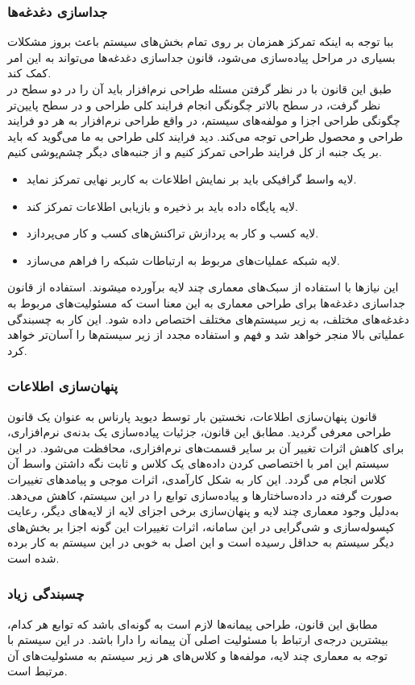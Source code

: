 \documentclass[12pt]{article}
\begin{document}
	\subsubsection{جداسازی دغدغه‌ها}
	ببا توجه به اینکه تمرکز همزمان بر روی تمام بخش‌های سیستم باعث بروز مشکلات بسیاری در مراحل پیاده‌سازی می‌شود، قانون جداسازی ‌دغدغه‌ها می‌تواند به این امر کمک کند.\\
	طبق این قانون با در نظر گرفتن مسئله طراحی نرم‌افزار باید آن را در دو سطح در نظر گرفت، در سطح بالاتر چگونگی انجام فرایند کلی طراحی و در سطح پایین‌تر چگونگی طراحی اجزا و مولفه‌های سیستم، در واقع طراحی نرم‌افزار به هر دو فرایند طراحی و محصول طراحی توجه می‌کند. دید فرایند کلی طراحی به ما می‌گوید که باید بر یک جنبه از کل فرایند طراحی تمرکز کنیم و از جنبه‌های دیگر چشم‌پوشی کنیم.

	\begin{itemize}
		\item
		لایه واسط گرافیکی باید بر نمایش اطلاعات به کاربر نهایی تمرکز نماید.
		\item
		لایه پایگاه داده باید بر ذخیره و بازیابی اطلاعات تمرکز کند.
		\item
		لایه کسب و کار به پردازش تراکنش‌های کسب و کار می‌پردازد.
		\item
		لایه شبکه عملیات‌های مربوط به ارتباطات شبکه را فراهم می‌سازد.
	\end{itemize}
این نیازها با استفاده از سبک‌های معماری چند لایه برآورده میشوند. استفاده از قانون جداسازی دغدغه‌ها برای طراحی معماری به این معنا است که مسئولیت‌های مربوط به دغدغه‌های مختلف، به زیر سیستم‌های مختلف اختصاص داده شود. این کار به چسبندگی عملیاتی بالا منجر خواهد شد و فهم و استفاده مجدد از زیر سیستم‌ها را آسان‌تر خواهد کرد.
	\subsubsection{پنهان‌سازی اطلاعات}
	قانون پنهان‌سازی اطلاعات، نخستین بار توسط دیوید پارناس به عنوان یک قانون طراحی معرفی گردید. مطابق این قانون، جزئیات پیاده‌سازی یک بدنه‌ی نرم‌افزاری، برای کاهش اثرات تغییر آن بر سایر قسمت‌های نرم‌افزاری، محافظت می‌شود. در این سیستم این امر با اختصاصی کردن داده‌های یک کلاس و ثابت نگه داشتن واسط آن کلاس انجام می‌ گردد. این کار به شکل کارآمدی، اثرات موجی و پیامدهای تغییرات صورت گرفته در داده‌ساختارها و پیاده‌سازی توابع را در این سیستم، کاهش می‌دهد. به‌دلیل وجود معماری چند لایه و پنهان‌سازی برخی اجزای لایه از لایه‌های دیگر، رعایت کپسوله‌سازی و شی‌گرایی در این سامانه، اثرات تغییرات این گونه اجزا بر بخش‌های دیگر سیستم به حداقل رسیده است و این اصل به خوبی در این سیستم به کار برده شده است.
	\subsubsection{چسبندگی زیاد}
	مطابق این قانون، طراحی پیمانه‌ها لازم است به گونه‌ای باشد که توابع هر کدام، بیشترین درجه‌ی ارتباط با مسئولیت اصلی آن پیمانه را دارا باشد. در این سیستم با توجه به معماری چند لایه، مولفه‌ها و کلاس‌های هر زیر سیستم به مسئولیت‌های آن مرتبط است.
\end{document}
